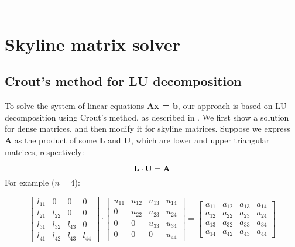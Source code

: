  \begin{figure}[htbp]
 \end{figure}
----------------------------------------------------------------



\section{Skyline matrix solver}

\subsection{Crout's method for LU decomposition}

To solve the system of linear equations {\bf Ax = b},
our approach is based on LU decomposition using Crout's method, as
described in \cite{Press86}.  We first show a solution for dense
matrices, and then modify it for skyline matrices.  Suppose we express
{\bf A} as the product of some {\bf L} and {\bf U}, which are lower
and upper triangular matrices, respectively:

 \[
{\bf L} \cdot {\bf U} = {\bf A}
 \]
For example ($n=4$):

{\footnotesize

 \[
\left[
\begin{array}{cccc}
l_{11} &    0   &   0    &   0    \\
l_{21} & l_{22} &   0    &   0    \\
l_{31} & l_{32} & l_{43} &   0    \\
l_{41} & l_{42} & l_{43} & l_{44}
\end{array}
\right]
\cdot
\left[
\begin{array}{cccc}
u_{11} & u_{12} & u_{13} & u_{14} \\
   0   & u_{22} & u_{23} & u_{24} \\
   0   &   0    & u_{33} & u_{34} \\
   0   &   0    &   0    & u_{44}
\end{array}
\right]
=
\left[
\begin{array}{cccc}
a_{11} & a_{12} & a_{13} & a_{14} \\
a_{12} & a_{22} & a_{23} & a_{24} \\
a_{13} & a_{32} & a_{33} & a_{34} \\
a_{14} & a_{42} & a_{43} & a_{44}
\end{array}
\right]
 \]

}

